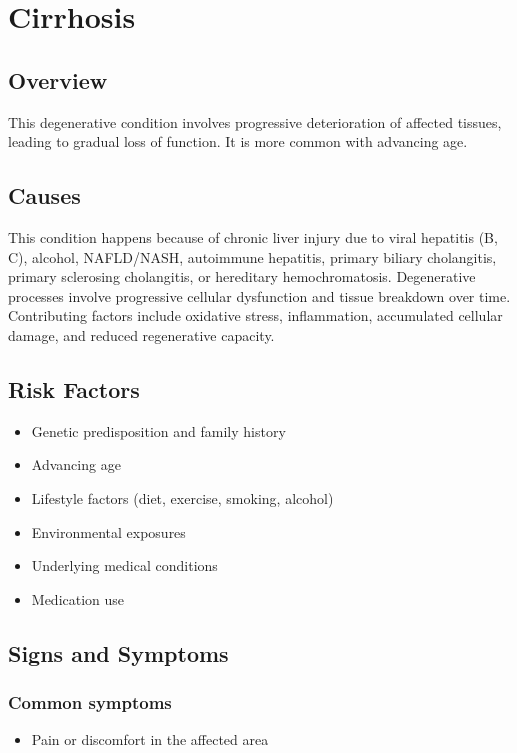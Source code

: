 \chapter{Cirrhosis}
\label{sec:Cirrhosis}

\section{Overview}
This degenerative condition involves progressive deterioration of affected tissues, leading to gradual loss of function. It is more common with advancing age.
\section{Causes}
This condition happens because of chronic liver injury due to viral hepatitis (B, C), alcohol, NAFLD/NASH, autoimmune hepatitis, primary biliary cholangitis, primary sclerosing cholangitis, or hereditary hemochromatosis. Degenerative processes involve progressive cellular dysfunction and tissue breakdown over time. Contributing factors include oxidative stress, inflammation, accumulated cellular damage, and reduced regenerative capacity.    
\section{Risk Factors}

\begin{itemize}[noitemsep]
  \item Genetic predisposition and family history
  \item Advancing age
  \item Lifestyle factors (diet, exercise, smoking, alcohol)
  \item Environmental exposures
  \item Underlying medical conditions
  \item Medication use
\end{itemize}
\section{Signs and Symptoms}

\subsection{Common symptoms}
\begin{itemize}[noitemsep]
  \item Pain or discomfort in the affected area
  \end{itemize}


